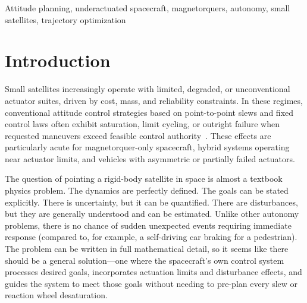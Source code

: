 \documentclass[conference]{IEEEtran}
\begin{document}
\begin{abstract}
Real-world implementation details address practical deployment: sequential replanning with overlapping trajectories, fallback modes for non-convergence, and closed-loop tracking using time-varying LQR. The C++ implementation runs on embedded-class processors, enabling autonomous onboard operation without ground-planned slews.

This work demonstrates that trajectory planning fundamentally expands what is achievable with limited actuator suites. The same framework supports magnetorquer-only CubeSats, hybrid configurations, and conventional reaction wheel systems with minimal reconfiguration.
\end{abstract}

\begin{IEEEkeywords}
Attitude planning, underactuated spacecraft, magnetorquers, autonomy, small satellites, trajectory optimization
\end{IEEEkeywords}

\section{Introduction}\label{sec:introduction}

Small satellites increasingly operate with limited, degraded, or unconventional actuator suites, driven by cost, mass, and reliability constraints. In these regimes, conventional attitude control strategies based on point-to-point slews and fixed control laws often exhibit saturation, limit cycling, or outright failure when requested maneuvers exceed feasible control authority~\cite{wertz1978spacecraft,wie2008spacecraft}. These effects are particularly acute for magnetorquer-only spacecraft, hybrid systems operating near actuator limits, and vehicles with asymmetric or partially failed actuators.

The question of pointing a rigid-body satellite in space is almost a textbook physics problem. The dynamics are perfectly defined. The goals can be stated explicitly. There is uncertainty, but it can be quantified. There are disturbances, but they are generally understood and can be estimated. Unlike other autonomy problems, there is no chance of sudden unexpected events requiring immediate response (compared to, for example, a self-driving car braking for a pedestrian). The problem can be written in full mathematical detail, so it seems like there should be a general solution---one where the spacecraft's own control system processes desired goals, incorporates actuation limits and disturbance effects, and guides the system to meet those goals without needing to pre-plan every slew or reaction wheel desaturation.
\end{document}

